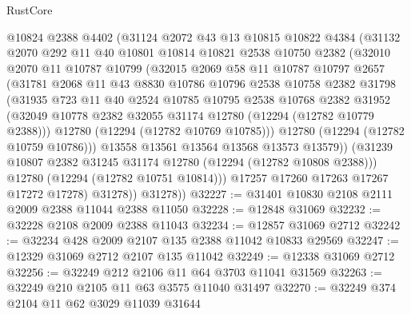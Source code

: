 \begin{lexlean}{RustCore}
\begin{coremodule}
            @10824
            @2388
            @4402
            (@31124
              @2072
              @43
              @13
              @10815
              @10822
              @4384
              (@31132
                @2070
                @292
                @11
                @40
                @10801
                @10814
                @10821
                @2538
                @10750
                @2382
                (@32010
                  @2070
                  @11
                  @10787
                  @10799
                  (@32015
                    @2069
                    @58
                    @11
                    @10787
                    @10797
                    @2657
                    (@31781
                      @2068
                      @11
                      @43
                      @8830
                      @10786
                      @10796
                      @2538
                      @10758
                      @2382
                      @31798
                      (@31935
                        @723
                        @11
                        @40
                        @2524
                        @10785
                        @10795
                        @2538
                        @10768
                        @2382
                        @31952
                        (@32049 @10778 @2382 @32055 @31174 @12780 (@12294 (@12782 @10779 @2388)))
                        @12780
                        (@12294 (@12782 @10769 @10785)))
                      @12780
                      (@12294 (@12782 @10759 @10786)))
                    @13558
                    @13561
                    @13564
                    @13568
                    @13573
                    @13579))
                (@31239 @10807 @2382 @31245 @31174 @12780 (@12294 (@12782 @10808 @2388)))
                @12780
                (@12294 (@12782 @10751 @10814)))
              @17257
              @17260
              @17263
              @17267
              @17272
              @17278)
            @31278))
        @31278))
@32227 := @31401 @10830 @2108 @2111 @2009 @2388 @11044 @2388 @11050
@32228 := @12848 @31069
@32232 := @32228 @2108 @2009 @2388 @11043
@32234 := @12857 @31069 @2712
@32242 := @32234 @428 @2009 @2107 @135 @2388 @11042 @10833 @29569
@32247 := @12329 @31069 @2712 @2107 @135 @11042
@32249 := @12338 @31069 @2712
@32256 := @32249 @212 @2106 @11 @64 @3703 @11041 @31569
@32263 := @32249 @210 @2105 @11 @63 @3575 @11040 @31497
@32270 := @32249 @374 @2104 @11 @62 @3029 @11039 @31644

\end{coremodule}
\end{lexlean}
